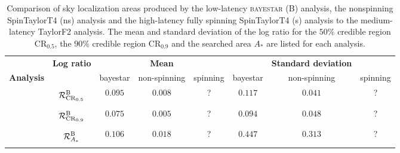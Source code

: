 \begin{table}
\begin{tabular}{cccccccc}
 & \textbf{Log ratio} & & \textbf{Mean} & & & \textbf{Standard deviation} & \\   
\textbf{Analysis} &  & bayestar & non-spinning & spinning & bayestar & non-spinning & spinning \\
 & $\displaystyle \vphantom{\frac{0}{0}} \mathcal{R}^\mathrm{B}_{\mathrm{CR}_{0.5}}$ & $0.095$ & $0.008$ & ? & $0.117$ & $0.041$ & ? \\
 & $\displaystyle \vphantom{\frac{0}{0}} \mathcal{R}^\mathrm{B}_{\mathrm{CR}_{0.9}}$ & $0.075$ & $0.005$ & ? & $0.094$ & $0.048$ & ? \\
 & $\displaystyle \vphantom{\frac{0}{0}} \mathcal{R}^\mathrm{B}_{A_\ast}$ & $0.106$ & $0.018$ & ? & $0.447$ & $0.313$ & ?
\end{tabular}
\caption{\label{tab:sky-ratio} Comparison of sky localization areas produced by the low-latency \textsc{bayestar} (B) analysis, the nonspinning SpinTaylorT4 (ns) analysis and the high-latency fully spinning SpinTaylorT4 (s) analysis to the medium-latency TaylorF2 analysis. The mean and standard deviation of the log ratio for the $50\%$ credible region $\mathrm{CR}_{0.5}$, the $90\%$ credible region $\mathrm{CR}_{0.9}$ and the searched area $A_\ast$ are listed for each analysis.}

\end{table}